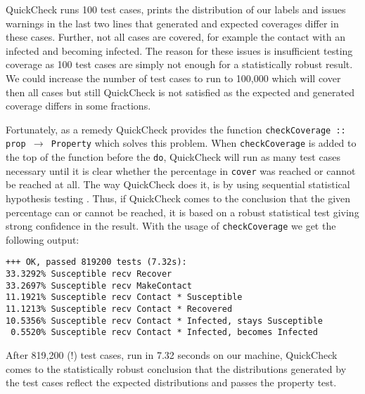 QuickCheck runs 100 test cases, prints the distribution of our labels and issues warnings in the last two lines that generated and expected coverages differ in these cases. Further, not all cases are covered, for example the contact with an infected and becoming infected. The reason for these issues is insufficient testing coverage as 100 test cases are simply not enough for a statistically robust result. We could increase the number of test cases to run to 100,000 which will cover then all cases but still QuickCheck is not satisfied as the expected and generated coverage differs in some fractions. %

Fortunately, as a remedy QuickCheck provides the function \texttt{checkCoverage :: prop $\rightarrow$ Property} which solves this problem. When \texttt{checkCoverage} is added to the top of the function before the \texttt{do}, QuickCheck will run as many test cases necessary until it is clear whether the percentage in \texttt{cover} was reached or cannot be reached at all. The way QuickCheck does it, is by using sequential statistical hypothesis testing \cite{wald_sequential_1992}. Thus, if QuickCheck comes to the conclusion that the given percentage can or cannot be reached, it is based on a robust statistical test giving strong confidence in the result. With the usage of \texttt{checkCoverage} we get the following output:

\begin{footnotesize}
\begin{verbatim}
+++ OK, passed 819200 tests (7.32s):
33.3292% Susceptible recv Recover
33.2697% Susceptible recv MakeContact
11.1921% Susceptible recv Contact * Susceptible
11.1213% Susceptible recv Contact * Recovered
10.5356% Susceptible recv Contact * Infected, stays Susceptible
 0.5520% Susceptible recv Contact * Infected, becomes Infected
\end{verbatim}
\end{footnotesize}

After 819,200 (!) test cases, run in 7.32 seconds on our machine, QuickCheck comes to the statistically robust conclusion that the distributions generated by the test cases reflect the expected distributions and passes the property test.